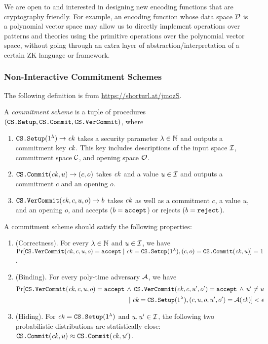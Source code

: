 \documentclass{article}
\begin{document}
We are open to and interested in designing
new encoding functions that are cryptography friendly.  
For example, an encoding function whose data space $\mathcal{D}$
is a polynomial vector space may allow
us to directly implement
operations over patterns and theories
using the primitive operations over the polynomial vector space,
without going through an extra layer of abstraction/interpretation 
of a certain ZK language or framework. 

\subsubsection{Non-Interactive Commitment Schemes}

The following definition is from \url{https://shorturl.at/jmozS}.

\begin{definition}
A \emph{commitment scheme} is a tuple of procedures
$(\textnormal{\texttt{CS.Setup}}, \textnormal{\texttt{CS.Commit}}, \textnormal{\texttt{CS.VerCommit}})$, where
\begin{enumerate}
\item $\textnormal{\texttt{CS.Setup}}(1^\lambda) \to \mathit{ck}$ 
      takes a security parameter $\lambda \in \mathbb{N}$
      and outputs a commitment key $\mathit{ck}$. This key includes descriptions of
      the input space
      $\mathcal{I}$,  commitment space $\mathcal{C}$, and opening space $\mathcal{O}$. 
\item $\textnormal{\texttt{CS.Commit}}(\mathit{ck}, u) \to  (c, o)$ takes $\mathit{ck}$ and a value $u \in \mathcal{I}$
      and outputs a commitment $c$ and an opening $o$.
\item $\textnormal{\texttt{CS.VerCommit}}(\mathit{ck}, c, u, o) \to b$ takes $\mathit{ck}$ as well as
      a commitment $c$, a value $u$, and an opening $o$,
      and accepts ($b = \textnormal{\texttt{accept}}$) or rejects ($b = \textnormal{\texttt{reject}}$).  
\end{enumerate}
A commitment scheme should satisfy the following properties:
\begin{enumerate}
\item (Correctness).
      For every $\lambda \in \mathbb{N}$ and $u \in \mathcal{I}$, we have
      $\Pr[\textnormal{\texttt{CS.VerCommit}}(\mathit{ck}, c, u, o) = \textnormal{\texttt{accept}} \mid \mathit{ck} = \textnormal{\texttt{CS.Setup}}(1^\lambda), (c,o) = \textnormal{\texttt{CS.Commit}}(\mathit{ck}, u)] = 1$. 
\item (Binding).
      For every poly-time adversary $\mathcal{A}$, we have
      \begin{align*}
           \Pr[\textnormal{\texttt{CS.VerCommit}}(\mathit{ck}, c, u, o) = \textnormal{\texttt{accept}} \,\land\,
           \textnormal{\texttt{CS.VerCommit}}(\mathit{ck}, c, u', o') = \textnormal{\texttt{accept}} \,\land\, u' \neq u
           \\ \mid
           \mathit{ck} = \textnormal{\texttt{CS.Setup}}(1^\lambda), (c,u,o,u',o') = \mathcal{A}(\mathit{ck})] < \epsilon
      \end{align*}
\item (Hiding). For $\mathit{ck} = \textnormal{\texttt{CS.Setup}}(1^\lambda)$ and $u,u' \in \mathcal{I}$,
      the following two probabilistic distributions are statistically close:
      $\textnormal{\texttt{CS.Commit}}(\mathit{ck}, u) \approx \textnormal{\texttt{CS.Commit}}(\mathit{ck}, u')$. 
\end{enumerate}
\end{definition}
\end{document}
